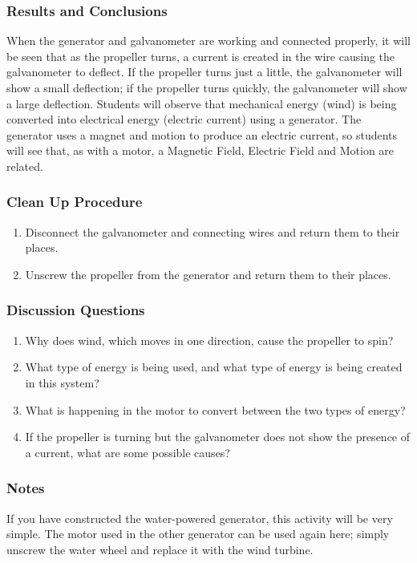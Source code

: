 \subsubsection*{Results and Conclusions}
When the generator and galvanometer are working and connected properly, it will be seen that as the propeller turns, a current is created in the wire causing the galvanometer to deflect. If the propeller turns just a little, the galvanometer will show a small deflection; if the propeller turns quickly, the galvanometer will show a large deflection.  
Students will observe that mechanical energy (wind) is being converted into electrical energy (electric current) using a generator. The generator uses a magnet and motion to produce an electric current, so students will see that, as with a motor, a Magnetic Field, Electric Field and Motion are related.  

\subsubsection*{Clean Up Procedure}
\begin{enumerate}
\item{Disconnect the galvanometer and connecting wires and return them to their places.} 
\item{Unscrew the propeller from the generator and return them to their places.} 
\end{enumerate}

\subsubsection*{Discussion Questions}
\begin{enumerate}
\item{Why does wind, which moves in one direction, cause the propeller to spin?}
\item{What type of energy is being used, and what type of energy is being created in this system?}
\item{What is happening in the motor to convert between the two types of energy?}
\item{If the propeller is turning but the galvanometer does not show the presence of a current, what are some possible causes?}
\end{enumerate}

\subsubsection*{Notes}
If you have constructed the water-powered generator, this activity will be very simple.  The motor used in the other generator can be used again here; simply unscrew the water wheel and replace it with the wind turbine.
